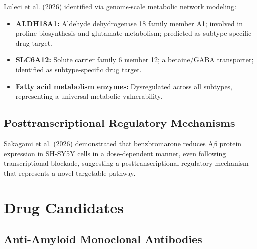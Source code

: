 \documentclass[11pt, a4paper]{article}
\begin{document}
Luleci et al. (2026) identified via genome-scale metabolic network modeling:

\begin{itemize}
    \item \textbf{ALDH18A1:} Aldehyde dehydrogenase 18 family member A1; involved in proline biosynthesis and glutamate metabolism; predicted as subtype-specific drug target.
    \item \textbf{SLC6A12:} Solute carrier family 6 member 12; a betaine/GABA transporter; identified as subtype-specific drug target.
    \item \textbf{Fatty acid metabolism enzymes:} Dysregulated across all subtypes, representing a universal metabolic vulnerability.
\end{itemize}

\subsection{Posttranscriptional Regulatory Mechanisms}

Sakagami et al. (2026) demonstrated that benzbromarone reduces A$\beta$ protein expression in SH-SY5Y cells in a dose-dependent manner, even following transcriptional blockade, suggesting a posttranscriptional regulatory mechanism that represents a novel targetable pathway.

\section{Drug Candidates}
\label{sec:drugs}

\subsection{Anti-Amyloid Monoclonal Antibodies}
\end{document}
